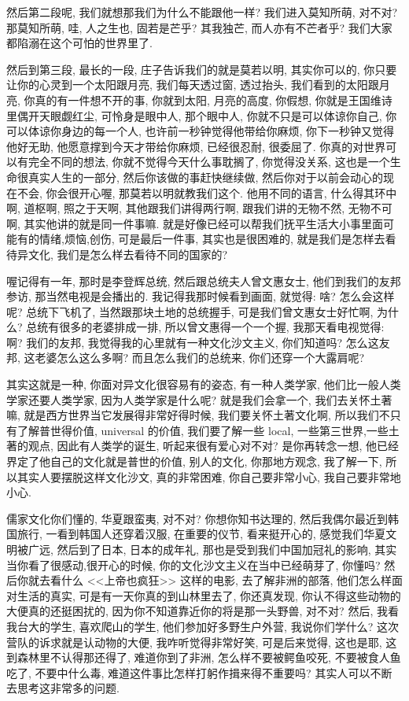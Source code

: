 \documentclass[11pt]{article}
\begin{document}
然后第二段呢, 我们就想那我们为什么不能跟他一样? 我们进入莫知所萌, 对不对? 那莫知所萌, 哇, 人之生也, 固若是芒乎? 其我独芒, 而人亦有不芒者乎?  我们大家都陷溺在这个可怕的世界里了.

然后到第三段, 最长的一段, 庄子告诉我们的就是莫若以明, 其实你可以的, 你只要让你的心灵到一个太阳跟月亮, 我们每天透过窗, 透过抬头, 我们看到的太阳跟月亮, 你真的有一件想不开的事, 你就到太阳, 月亮的高度, 你假想, 你就是王国维诗里偶开天眼觑红尘, 可怜身是眼中人, 那个眼中人, 你就不只是可以体谅你自己, 你可以体谅你身边的每一个人, 也许前一秒钟觉得他带给你麻烦, 你下一秒钟又觉得他好无助, 他愿意撑到今天才带给你麻烦, 已经很忍耐, 很委屈了. 你真的对世界可以有完全不同的想法, 你就不觉得今天什么事耽搁了, 你觉得没关系, 这也是一个生命很真实人生的一部分, 然后你该做的事赶快继续做, 然后你对于以前会动心的现在不会, 你会很开心喔, 那莫若以明就教我们这个. 他用不同的语言, 什么得其环中啊, 道枢啊, 照之于天啊, 其他跟我们讲得两行啊, 跟我们讲的无物不然, 无物不可啊, 其实他讲的就是同一件事嘛. 就是好像已经可以帮我们抚平生活大小事里面可能有的情绪,烦恼,创伤, 可是最后一件事, 其实也是很困难的, 就是我们是怎样去看待异文化, 我们是怎么样去看待不同的国家的? 

喔记得有一年, 那时是李登辉总统, 然后跟总统夫人曾文惠女士, 他们到我们的友邦参访, 那当然电视是会播出的. 我记得我那时候看到画面, 就觉得: 啥? 怎么会这样呢? 总统下飞机了, 当然跟那块土地的总统握手, 可是我们曾文惠女士好忙啊, 为什么? 总统有很多的老婆排成一排, 所以曾文惠得一个一个握, 我那天看电视觉得: 啊? 我们的友邦, 我觉得我的心里就有一种文化沙文主义, 你们知道吗?  怎么这友邦, 这老婆怎么这么多啊? 而且怎么我们的总统来, 你们还穿一个大露肩呢? 

其实这就是一种, 你面对异文化很容易有的姿态, 有一种人类学家, 他们比一般人类学家还要人类学家, 因为人类学家是什么呢? 就是我们会拿一个, 我们去关怀土著嘛, 就是西方世界当它发展得非常好得时候, 我们要关怀土著文化啊, 所以我们不只有了解普世得价值, universal 的价值, 我们要了解一些 local, 一些第三世界,一些土著的观点, 因此有人类学的诞生, 听起来很有爱心对不对? 是你再转念一想, 他已经界定了他自己的文化就是普世的价值, 别人的文化, 你那地方观念, 我了解一下, 所以其实人要摆脱这样文化沙文, 真的非常困难, 你自己要非常小心, 我自己要非常地小心. 

儒家文化你们懂的, 华夏跟蛮夷, 对不对? 你想你知书达理的, 然后我偶尔最近到韩国旅行, 一看到韩国人还穿着汉服, 在重要的仪节, 看来挺开心的, 感觉我们华夏文明被广远, 然后到了日本, 日本的成年礼, 那也是受到我们中国加冠礼的影响, 其实当你看了很感动,很开心的时候, 你的文化沙文主义在当中已经萌芽了, 你懂吗? 然后你就去看什么 <<上帝也疯狂>> 这样的电影, 去了解非洲的部落, 他们怎么样面对生活的真实, 可是有一天你真的到山林里去了, 你还真发现, 你认不得这些动物的大便真的还挺困扰的, 因为你不知道靠近你的将是那一头野兽, 对不对? 然后, 我看我台大的学生, 喜欢爬山的学生, 他们参加好多野生户外营, 我说你们学什么? 这次营队的诉求就是认动物的大便, 我咋听觉得非常好笑, 可是后来觉得, 这也是耶, 这到森林里不认得那还得了, 难道你到了非洲, 怎么样不要被鳄鱼咬死, 不要被食人鱼吃了, 不要中什么毒, 难道这件事比怎样打躬作揖来得不重要吗? 其实人可以不断去思考这非常多的问题.
\end{document}
